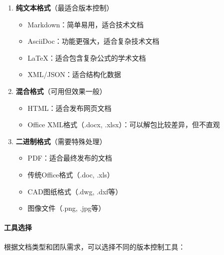 \begin{enumerate}
\def\labelenumi{\arabic{enumi}.}
\tightlist
\item
  \textbf{纯文本格式}（最适合版本控制）

  \begin{itemize}
  \tightlist
  \item
    Markdown：简单易用，适合技术文档
  \item
    AsciiDoc：功能更强大，适合复杂技术文档
  \item
    LaTeX：适合包含复杂公式的学术文档
  \item
    XML/JSON：适合结构化数据
  \end{itemize}
\item
  \textbf{混合格式}（可用但效果一般）

  \begin{itemize}
  \tightlist
  \item
    HTML：适合发布网页文档
  \item
    Office XML格式（.docx, .xlsx）：可以解包比较差异，但不直观
  \end{itemize}
\item
  \textbf{二进制格式}（需要特殊处理）

  \begin{itemize}
  \tightlist
  \item
    PDF：适合最终发布的文档
  \item
    传统Office格式（.doc, .xls）
  \item
    CAD图纸格式（.dwg, .dxf等）
  \item
    图像文件（.png, .jpg等）
  \end{itemize}
\end{enumerate}

\paragraph{工具选择}\label{ux5de5ux5177ux9009ux62e9}

根据文档类型和团队需求，可以选择不同的版本控制工具：

